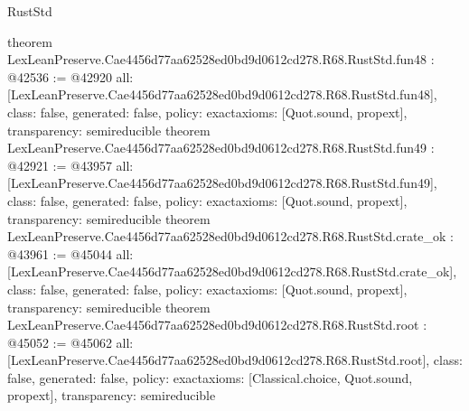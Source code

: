 \begin{lexlean}{RustStd}
\begin{coremodule}
{}
theorem LexLeanPreserve.Cae4456d77aa62528ed0bd9d0612cd278.R68.RustStd.fun48 : @42536 := @42920 {
  all: [LexLeanPreserve.Cae4456d77aa62528ed0bd9d0612cd278.R68.RustStd.fun48],
  class: false,
  generated: false,
  policy: exact{axioms: [Quot.sound, propext]},
  transparency: semireducible
}
theorem LexLeanPreserve.Cae4456d77aa62528ed0bd9d0612cd278.R68.RustStd.fun49 : @42921 := @43957 {
  all: [LexLeanPreserve.Cae4456d77aa62528ed0bd9d0612cd278.R68.RustStd.fun49],
  class: false,
  generated: false,
  policy: exact{axioms: [Quot.sound, propext]},
  transparency: semireducible
}
theorem LexLeanPreserve.Cae4456d77aa62528ed0bd9d0612cd278.R68.RustStd.crate_ok : @43961 := @45044 {
  all: [LexLeanPreserve.Cae4456d77aa62528ed0bd9d0612cd278.R68.RustStd.crate_ok],
  class: false,
  generated: false,
  policy: exact{axioms: [Quot.sound, propext]},
  transparency: semireducible
}
theorem LexLeanPreserve.Cae4456d77aa62528ed0bd9d0612cd278.R68.RustStd.root : @45052 := @45062 {
  all: [LexLeanPreserve.Cae4456d77aa62528ed0bd9d0612cd278.R68.RustStd.root],
  class: false,
  generated: false,
  policy: exact{axioms: [Classical.choice, Quot.sound, propext]},
  transparency: semireducible
}


\end{coremodule}
\end{lexlean}

